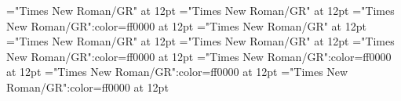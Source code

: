 \documentclass[a4paper]{article}
\begin{document}
\pagestyle{plain}
\sloppy
\setlength{\parfillskip}{0pt plus 1fil}
\font\sectionletter="Times New Roman/GR" at 12pt
\font\articlesectionletter="Times New Roman/GR" at 12pt
\font\firstoftypesensearticlesectionletter="Times New Roman/GR":color=ff0000 at 12pt
\font\firstoftypeheadwordlastoftypesectionletter="Times New Roman/GR" at 12pt
\font\firstoftypelastoftypepronunciationarticlesectionletter="Times New Roman/GR" at 12pt
\font\firstoftypelastoftypestressfirstoftypelastoftypepronunciationarticlesectionletter="Times New Roman/GR" at 12pt
\font\lastoftypesensearticlesectionletter="Times New Roman/GR":color=ff0000 at 12pt
\font\firstoftypegrammarcategorylastoftypelastoftypesensearticlesectionletter="Times New Roman/GR":color=ff0000 at 12pt
\font\exampleusefirstoftypelastoftypelastoftypesensearticlesectionletter="Times New Roman/GR":color=ff0000 at 12pt
\font\examplefirstoftypelastoftypelastoftypesensearticlesectionletter="Times New Roman/GR":color=ff0000 at 12pt

\mbox{} 
\newpage 
\newpage 
\setcounter{page}{1} 
\pagestyle{fancy} 

\end{document}
